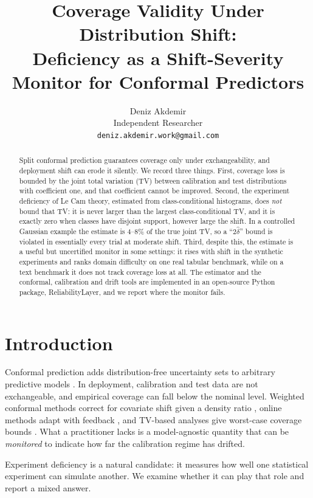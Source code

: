 \documentclass{article}
\title{Coverage Validity Under Distribution Shift:\\
Deficiency as a Shift-Severity Monitor for Conformal Predictors}
\author{
  Deniz Akdemir\\
  Independent Researcher\\
  \texttt{deniz.akdemir.work@gmail.com}
}
\date{}
\begin{document}
\maketitle

\begin{abstract}
Split conformal prediction guarantees coverage only under exchangeability, and
deployment shift can erode it silently. We record three things. First, coverage
loss is bounded by the joint total variation (TV) between calibration and test
distributions with coefficient one, and that coefficient cannot be improved.
Second, the experiment deficiency of Le Cam theory, estimated from
class-conditional histograms, does \emph{not} bound that TV: it is never larger
than the largest class-conditional TV, and it is exactly zero when classes have
disjoint support, however large the shift. In a controlled Gaussian example
the estimate is 4--8\% of the true joint TV, so a ``$2\hat\delta$'' bound is
violated in essentially every trial at moderate shift. Third, despite this, the
estimate is a useful but uncertified monitor in some settings: it rises with
shift in the synthetic experiments and ranks domain difficulty on one real
tabular benchmark, while on a text benchmark it does not track coverage loss
at all. The estimator and the conformal, calibration and drift tools are
implemented in an open-source Python package, ReliabilityLayer, and we
report where the monitor fails.
\end{abstract}

\section{Introduction}

Conformal prediction adds distribution-free uncertainty sets to arbitrary
predictive models \citep{vovk2005algorithmic,angelopoulos2021gentle}. In
deployment, calibration and test data are not exchangeable, and empirical
coverage can fall below the nominal level. Weighted conformal methods correct
for covariate shift given a density ratio \citep{tibshirani2019conformal},
online methods adapt with feedback \citep{gibbs2021adaptive}, and
TV-based analyses give worst-case coverage bounds
\citep{barber2023conformal}. What a practitioner lacks is a model-agnostic
quantity that can be \emph{monitored} to indicate how far the calibration
regime has drifted.

Experiment deficiency \citep{lecam1986asymptotic,torgersen1991comparison} is a
natural candidate: it measures how well one statistical experiment can simulate
another. We examine whether it can play that role and report a mixed answer.
\end{document}
